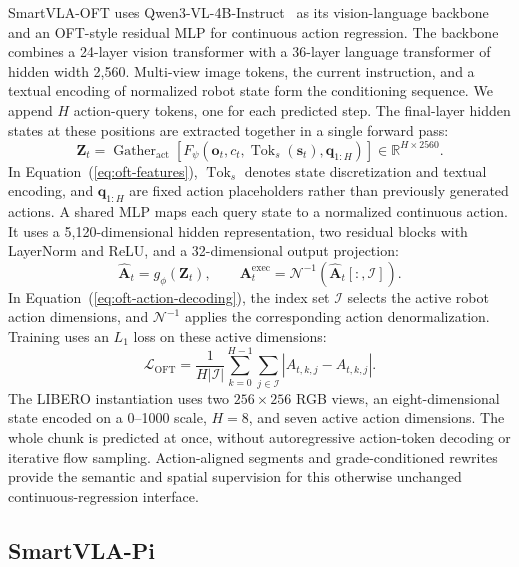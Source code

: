 SmartVLA-OFT uses Qwen3-VL-4B-Instruct~\citep{bai2025qwen3vl} as its vision-language backbone
and an OFT-style residual MLP for continuous action regression. The
backbone combines a 24-layer vision transformer with a 36-layer language
transformer of hidden width 2,560. Multi-view image tokens, the current
instruction, and a textual encoding of normalized robot state form the
conditioning sequence. We append $H$ action-query tokens, one for each
predicted step. The final-layer hidden states at these positions are
extracted together in a single forward pass:
\begin{equation}
\label{eq:oft-features}
\mathbf{Z}_t=\operatorname{Gather}_{\mathrm{act}}
\!\left[F_\psi(\mathbf{o}_t,c_t,
\operatorname{Tok}_s(\mathbf{s}_t),\mathbf{q}_{1:H})\right]
\in\mathbb{R}^{H\times2560}.
\end{equation}
In Equation~(\ref{eq:oft-features}), $\operatorname{Tok}_s$ denotes state discretization and textual
encoding, and $\mathbf{q}_{1:H}$ are fixed action placeholders rather
than previously generated actions. A shared MLP maps each query state
to a normalized continuous action. It uses a 5,120-dimensional hidden
representation, two residual blocks with LayerNorm and ReLU, and a
32-dimensional output projection:
\begin{equation}
\label{eq:oft-action-decoding}
\widehat{\mathbf{A}}_t=g_\phi(\mathbf{Z}_t),\qquad
\mathbf{A}^{\mathrm{exec}}_t=
\mathcal{N}^{-1}\!\left(\widehat{\mathbf{A}}_t[:,\mathcal{I}]\right).
\end{equation}
In Equation~(\ref{eq:oft-action-decoding}), the index set $\mathcal{I}$ selects the active robot
action dimensions,
and $\mathcal{N}^{-1}$ applies the corresponding action denormalization.
Training uses an $L_1$ loss on these active dimensions:
\begin{equation}
\label{eq:oft-loss}
\mathcal{L}_{\mathrm{OFT}}=
\frac{1}{H|\mathcal{I}|}\sum_{k=0}^{H-1}\sum_{j\in\mathcal{I}}
\left|\widehat{A}_{t,k,j}-A_{t,k,j}\right|.
\end{equation}
The LIBERO instantiation uses two $256\times256$ RGB views, an
eight-dimensional state encoded on a 0--1000 scale, $H=8$, and seven
active action dimensions. The whole chunk is predicted at once, without
autoregressive action-token decoding or iterative flow sampling.
Action-aligned segments and grade-conditioned rewrites provide the
semantic and spatial supervision for this otherwise unchanged
continuous-regression interface.

\subsection{SmartVLA-Pi}
\label{app:smartvla-pi}

